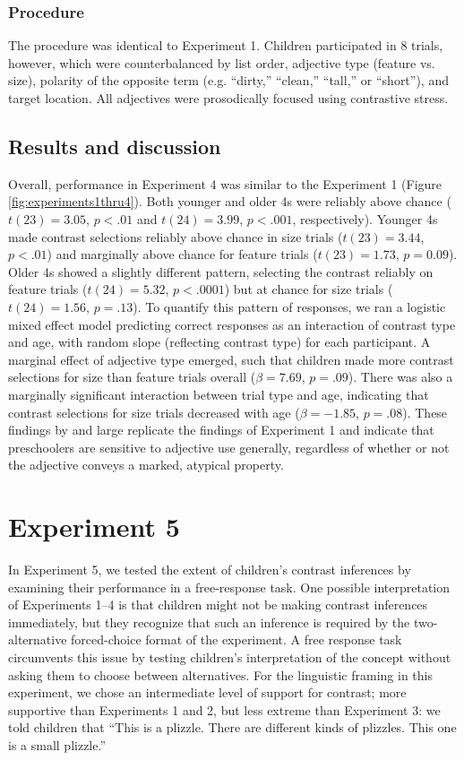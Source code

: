 \documentclass[man]{apa2}
\begin{document}
\subsubsection{Procedure}

The procedure was identical to Experiment 1. Children participated in 8 trials, however, which were counterbalanced by list order, adjective type (feature vs. size), polarity of the opposite term (e.g. ``dirty,'' ``clean,'' ``tall,'' or ``short''), and target location. All adjectives were prosodically focused using contrastive stress. 

\subsection{Results and discussion}

Overall, performance in Experiment 4 was similar to the Experiment 1 (Figure \ref{fig:experiments1thru4}). 
Both younger and older 4s were reliably above chance ($t(23) = 3.05$, $p<.01$ and $t(24) = 3.99$, $p<.001$, respectively). Younger 4s made contrast selections reliably above chance in size trials ($t(23)=3.44$, $p<.01$) and marginally above chance for feature trials ($t(23)=1.73$, $p=0.09$). Older 4s showed a slightly different pattern, selecting the contrast reliably on feature trials ($t(24)=5.32$, $p<.0001$) but at chance for size trials ($t(24)=1.56$, $p=.13$). To quantify this pattern of responses, we ran a logistic mixed effect model predicting correct responses as an interaction of contrast type and age, with random slope (reflecting contrast type) for each participant.  A marginal effect of adjective type emerged, such that children made more contrast selections for size than feature trials overall ($\beta = 7.69$, $p = .09$). There was also a marginally significant interaction between trial type and age, indicating that contrast selections for size trials decreased with age ($\beta = -1.85$, $p = .08$). These findings by and large replicate the findings of Experiment 1 and indicate that preschoolers are sensitive to adjective use generally, regardless of whether or not the adjective conveys a marked, atypical property.






\section{Experiment 5} 

In Experiment 5, we tested the extent of children's contrast inferences by examining their performance in a free-response task. One possible interpretation of Experiments 1--4 is that children might not be making  contrast inferences immediately, but they recognize that such an inference is required by the two-alternative forced-choice format of the experiment. A free response task circumvents this issue by testing children's interpretation of the concept without asking them to choose between alternatives. For the linguistic framing in this experiment, we chose an intermediate level of support for contrast; more supportive than Experiments 1 and 2, but less extreme than Experiment 3: we told children that ``This is a plizzle. There are different kinds of plizzles. This one is a small plizzle.'' 
\end{document}
